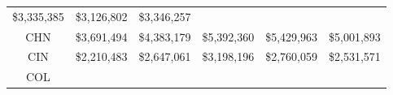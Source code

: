 \documentclass[]{book}
\theoremstyle{definition}
\theoremstyle{definition}
\theoremstyle{definition}
\theoremstyle{remark}
\begin{document}
\begin{longtable}[]{@{}cccccc@{}}
\begin{minipage}[t]{0.15\columnwidth}
\$3,335,385\strut
\end{minipage} & \begin{minipage}[t]{0.15\columnwidth}\centering
\$3,126,802\strut
\end{minipage} & \begin{minipage}[t]{0.15\columnwidth}\centering
\$3,346,257\strut
\end{minipage}\tabularnewline
\begin{minipage}[t]{0.09\columnwidth}\centering
CHN\strut
\end{minipage} & \begin{minipage}[t]{0.15\columnwidth}\centering
\$3,691,494\strut
\end{minipage} & \begin{minipage}[t]{0.15\columnwidth}\centering
\$4,383,179\strut
\end{minipage} & \begin{minipage}[t]{0.15\columnwidth}\centering
\$5,392,360\strut
\end{minipage} & \begin{minipage}[t]{0.15\columnwidth}\centering
\$5,429,963\strut
\end{minipage} & \begin{minipage}[t]{0.15\columnwidth}\centering
\$5,001,893\strut
\end{minipage}\tabularnewline
\begin{minipage}[t]{0.09\columnwidth}\centering
CIN\strut
\end{minipage} & \begin{minipage}[t]{0.15\columnwidth}\centering
\$2,210,483\strut
\end{minipage} & \begin{minipage}[t]{0.15\columnwidth}\centering
\$2,647,061\strut
\end{minipage} & \begin{minipage}[t]{0.15\columnwidth}\centering
\$3,198,196\strut
\end{minipage} & \begin{minipage}[t]{0.15\columnwidth}\centering
\$2,760,059\strut
\end{minipage} & \begin{minipage}[t]{0.15\columnwidth}\centering
\$2,531,571\strut
\end{minipage}\tabularnewline
\begin{minipage}[t]{0.09\columnwidth}\centering
COL\strut
\end{minipage} & \begin{minipage}[t]{0.15\columnwidth}\centering

\end{minipage}
\end{longtable}
\end{document}
